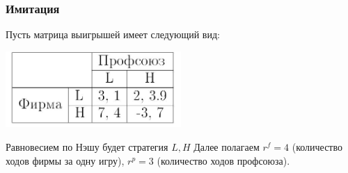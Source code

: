 \documentclass {beamer}
\begin{document}
\begin{frame}
	\frametitle{Имитация}
		Пусть матрица выигрышей имеет следующий вид:
		
		\begin{center}
			\includegraphics[width=0.5\textwidth]{seventh}
		\end{center}
		
		 Равновесием по Нэшу будет стратегия $L,H$
Далее полагаем $r^f= 4 $ (количество ходов фирмы за одну игру),
$r^p= 3$ (количество ходов профсоюза). 
	
	

\end{frame}
\end{document}

